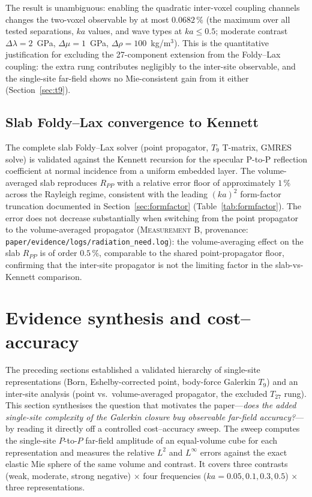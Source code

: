 \documentclass[11pt,a4paper]{article}
\theoremstyle{plain}
\theoremstyle{definition}
\theoremstyle{remark}
\begin{document}
The result is unambiguous: enabling the quadratic inter-voxel coupling
channels changes the two-voxel observable by at most $0.0682\,\%$ (the
maximum over all tested separations, $ka$ values, and wave types at
$ka \le 0.5$; moderate contrast $\Delta\lambda = 2$~GPa,
$\Delta\mu = 1$~GPa, $\Delta\rho = 100$~kg/m$^3$).  This is the
quantitative justification for excluding the 27-component extension
from the Foldy--Lax coupling: the extra rung contributes negligibly
to the inter-site observable, and the single-site far-field shows no
Mie-consistent gain from it either (Section~\ref{sec:t9}).

\subsection{Slab Foldy--Lax convergence to Kennett}
\label{sec:inter-slab-kennett}

The complete slab Foldy--Lax solver (point propagator, $T_9$ T-matrix,
GMRES solve) is validated against the Kennett recursion
\cite{kennett1983} for the specular P-to-P reflection coefficient at
normal incidence from a uniform embedded layer.  The volume-averaged
slab reproduces $R_{PP}$ with a relative error floor of approximately
$1\,\%$ across the Rayleigh regime, consistent with the leading
$(ka)^2$ form-factor truncation documented in Section~\ref{sec:formfactor}
(Table~\ref{tab:formfactor}).  The error does not decrease substantially
when switching from the point propagator to the volume-averaged
propagator (\textsc{Measurement B}, provenance:
\texttt{paper/evidence/logs/radiation\_need.log}): the volume-averaging
effect on the slab $R_{PP}$ is of order $0.5\,\%$, comparable to the
shared point-propagator floor, confirming that the inter-site propagator
is not the limiting factor in the slab-vs-Kennett comparison.

\section{Evidence synthesis and cost--accuracy}\label{sec:evidence}

The preceding sections established a validated hierarchy of single-site
representations (Born, Eshelby-corrected point, body-force Galerkin $T_9$)
and an inter-site analysis (point vs.\ volume-averaged propagator, the
excluded $T_{27}$ rung).  This section synthesises the question that motivates
the paper---\emph{does the added single-site complexity of the Galerkin
closure buy observable far-field accuracy?}---by reading it directly off a
controlled cost--accuracy sweep.  The sweep computes the single-site $P$-to-$P$
far-field amplitude of an equal-volume cube for each representation and measures
the relative $L^2$ and $L^\infty$ errors against the exact elastic Mie sphere of
the same volume and contrast.  It covers three contrasts (weak, moderate,
strong negative) $\times$ four frequencies ($ka = 0.05, 0.1, 0.3, 0.5$)
$\times$ three representations.
\end{document}
